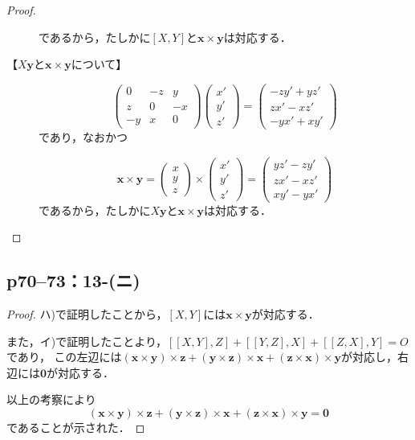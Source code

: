 \documentclass[a4paper,10pt,fleqn]{ltjsarticle}
\begin{document}
\begin{leftbar}
\begin{proof}
\begin{description}
\[                  \]
                  であるから，たしかに$[X,Y]$と$\bm{x} \times \bm{y}$は対応する．
            \item[【$X\bm{y}$と$\bm{x}\times\bm{y}$について】]
                  \[
                      \begin{pmatrix} 0 & -z & y \\ z & 0 & -x \\ -y & x & 0 \end{pmatrix} \begin{pmatrix} x' \\ y' \\ z' \end{pmatrix} = \begin{pmatrix} -zy'+yz' \\ zx'-xz' \\ -yx'+xy' \end{pmatrix}
                  \]
                  であり，なおかつ

                  \[
                      \bm{x}\times \bm{y} = \begin{pmatrix} x \\ y \\ z \end{pmatrix} \times \begin{pmatrix} x' \\ y ' \\ z' \end{pmatrix} = \begin{pmatrix} yz'-zy' \\ zx'-xz' \\ xy'-yx' \end{pmatrix}
                  \]
                  であるから，たしかに$X\bm{y}$と$\bm{x} \times \bm{y}$は対応する．
        \end{description}
    \end{proof}
\end{leftbar}


\newpage

\subsection*{p70--73：13-(ニ)}
\begin{tleftbar}
    \begin{proof}
        ハ)で証明したことから，$[X,Y]$には$\bm{x} \times \bm{y}$が対応する．

        また，イ)で証明したことより，$[[X,Y],Z] +[[Y,Z],X]+[[Z,X],Y]=O$であり，
        この左辺には$(\bm{x}\times\bm{y}) \times \bm{z} + (\bm{y}\times\bm{z}) \times \bm{x} + (\bm{z}\times\bm{x}) \times \bm{y}$が対応し，右辺には$\bm{0}$が対応する．

        以上の考察により
        \[
            (\bm{x}\times\bm{y}) \times \bm{z} + (\bm{y}\times\bm{z}) \times \bm{x} + (\bm{z}\times\bm{x}) \times \bm{y} =\bm{0}
        \]
        であることが示された．
    \end{proof}
\end{tleftbar}
\end{document}
